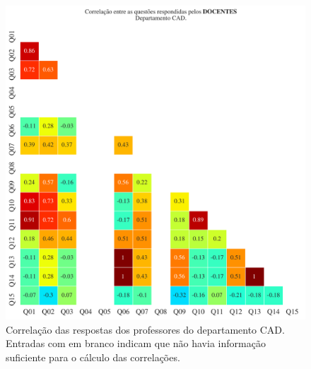\documentclass[a4paper,10pt]{article}
\begin{document}
\begin{figure}[h]
\centering
\includegraphics[width=0.999\linewidth]{matriz_corr__CAD_docentes.png}
\caption{\label{fig:corr_docentes}Correlação das respostas dos professores do departamento CAD. Entradas com em branco indicam que não havia informação suficiente para o cálculo das correlações.}
\end{figure}
\end{document}
